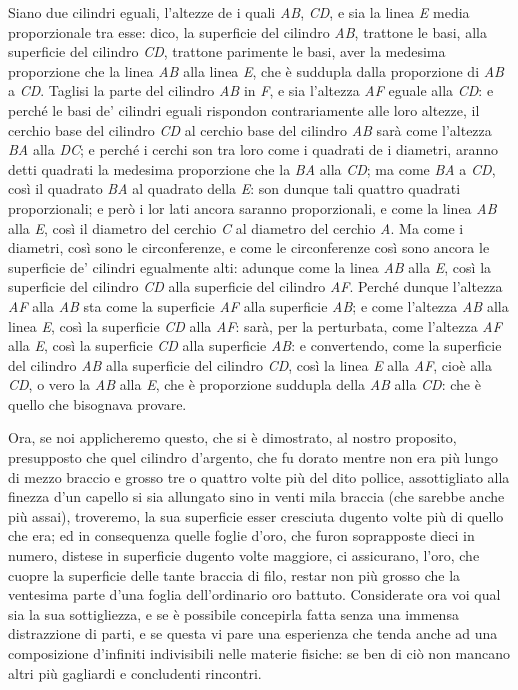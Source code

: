 \documentclass[11pt,twoside,openany]{book}
\begin{document}
Siano due cilindri eguali, l'altezze de i quali \emph{AB}, \emph{CD}, e sia la linea \emph{E} media proporzionale tra esse: dico, la superficie del cilindro \emph{AB}, trattone le basi, alla superficie del cilindro \emph{CD}, trattone parimente le basi, aver la medesima proporzione che la linea \emph{AB} alla linea \emph{E}, che è suddupla dalla proporzione di \emph{AB} a \emph{CD}. Taglisi la parte del cilindro \emph{AB} in \emph{F}, e sia l'altezza \emph{AF} eguale alla \emph{CD}: e perché le basi de' cilindri eguali rispondon contrariamente alle loro altezze, il cerchio base del cilindro \emph{CD} al cerchio base del cilindro \emph{AB} sarà come l'altezza \emph{BA} alla \emph{DC}; e perché i cerchi son tra loro come i quadrati de i diametri, aranno detti quadrati la medesima proporzione che la \emph{BA} alla \emph{CD}; ma come \emph{BA} a \emph{CD}, così il quadrato \emph{BA} al quadrato della \emph{E}: son dunque tali quattro quadrati proporzionali; e però i lor lati ancora saranno proporzionali, e come la linea \emph{AB} alla \emph{E}, così il diametro del cerchio \emph{C} al diametro del cerchio \emph{A}. Ma come i diametri, così sono le circonferenze, e come le circonferenze così sono ancora le superficie de' cilindri egualmente alti: adunque come la linea \emph{AB} alla \emph{E}, così la superficie del cilindro \emph{CD} alla superficie del cilindro \emph{AF}. Perché dunque l'altezza \emph{AF} alla \emph{AB} sta come la superficie \emph{AF} alla superficie \emph{AB}; e come l'altezza \emph{AB} alla linea \emph{E}, così la superficie \emph{CD} alla \emph{AF}: sarà, per la perturbata, come l'altezza \emph{AF} alla \emph{E}, così la superficie \emph{CD} alla superficie \emph{AB}: e convertendo, come la superficie del cilindro \emph{AB} alla superficie del cilindro \emph{CD}, così la linea \emph{E} alla \emph{AF}, cioè alla \emph{CD}, o vero la \emph{AB} alla \emph{E}, che è proporzione suddupla della \emph{AB} alla \emph{CD}: che è quello che bisognava provare.

Ora, se noi applicheremo questo, che si è dimostrato, al nostro proposito, presupposto che quel cilindro d'argento, che fu dorato mentre non era più lungo di mezzo braccio e grosso tre o quattro volte più del dito pollice, assottigliato alla finezza d'un capello si sia allungato sino in venti mila braccia (che sarebbe anche più assai), troveremo, la sua superficie esser cresciuta dugento volte più di quello che era; ed in consequenza quelle foglie d'oro, che furon soprapposte dieci in numero, distese in superficie dugento volte maggiore, ci assicurano, l'oro, che cuopre la superficie delle tante braccia di filo, restar non più grosso che la ventesima parte d'una foglia dell'ordinario oro battuto. Considerate ora voi qual sia la sua sottigliezza, e se è possibile concepirla fatta senza una immensa distrazzione di parti, e se questa vi pare una esperienza che tenda anche ad una composizione d'infiniti indivisibili nelle materie fisiche: se ben di ciò non mancano altri più gagliardi e concludenti rincontri.
\end{document}
